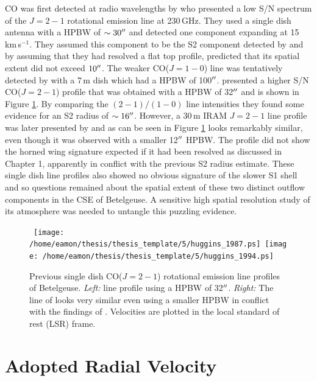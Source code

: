 CO was first detected at radio wavelengths by \cite{knapp_1980} who presented a low S/N spectrum of the $J= 2-1$ rotational emission line at 230\,GHz. They used a single dish antenna with a HPBW of $\sim 30^{\prime\prime}$ and detected one component expanding at 15\,km\,s$^{-1}$. They assumed this component to be the S2 component detected by  \cite{bernat_1979} and by assuming that they had resolved a flat top profile, predicted that its spatial extent did not exceed $10^{\prime\prime}$. The weaker CO($J=1-0$) line was tentatively detected by \cite{knapp_1985} with a 7\,m dish which had a HPBW of 100$^{\prime\prime}$. \cite{huggins_1987} presented a higher S/N CO($J=2-1$) profile that was obtained with a HPBW of 32$^{\prime\prime}$ and is shown in Figure \ref{fig:5.2}. By comparing the  $(2-1)/(1-0)$ line intensities they found some evidence for an S2 radius of $\sim 16^{\prime\prime}$. However,  a 30\,m IRAM $J= 2-1$ line profile was later presented by \cite{huggins_1994} and as can be seen in Figure \ref{fig:5.2} looks remarkably similar, even though it was observed with a smaller 12$^{\prime\prime}$ HPBW. The profile did not show the horned wing signature expected if it had been resolved as discussed in Chapter 1, apparently in conflict with the previous S2 radius estimate. These single dish line profiles also showed no obvious signature of the slower S1 shell and so questions remained about the spatial extent of these two distinct outflow components in the CSE of Betelgeuse. A sensitive high spatial resolution study of its atmosphere was needed to untangle this puzzling evidence.

\begin{figure}[!t]
\centering 
\mbox{
          \texttt{[image: /home/eamon/thesis/thesis\_template/5/huggins\_1987.ps]}
          \texttt{[image: /home/eamon/thesis/thesis\_template/5/huggins\_1994.ps]}
          }
\caption[Previous CO($J= 2-1$) rotational emission line profiles]{Previous single dish CO($J= 2-1$) rotational emission line profiles of Betelgeuse. \textit{Left:} \cite{huggins_1987} line profile using a HPBW of 32$^{\prime\prime}$. \textit{Right:} The line of \cite{huggins_1994} looks very similar even using a smaller HPBW in conflict with the findings of \cite{huggins_1987}. Velocities are plotted in the local standard of rest (LSR) frame.}
\label{fig:5.2}
\end{figure}

\section{Adopted Radial Velocity}\label{sec:5.2}

